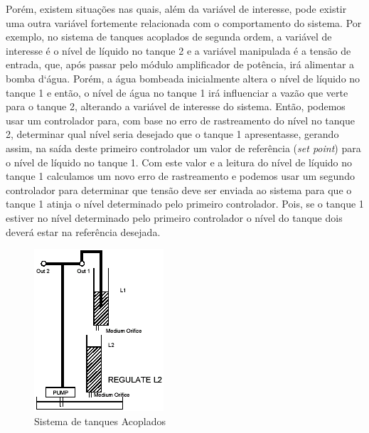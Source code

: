 \documentclass[a4paper,12pt]{article}
\begin{document}
\begin{flushleft}
\begin{flushleft}
\hspace{4ex}Porém, existem situações nas quais, além da variável de interesse, pode existir uma outra variável fortemente relacionada com o comportamento do sistema. Por exemplo, no sistema de tanques acoplados de segunda ordem, a variável de interesse é o nível de líquido no tanque 2 e a variável manipulada é a tensão de entrada, que, após passar pelo módulo amplificador de potência, irá alimentar a bomba d`água. Porém, a água bombeada inicialmente altera o nível de líquido no tanque 1 e então, o nível de água no tanque 1 irá influenciar a vazão que verte para o tanque 2, alterando a variável de interesse do sistema. Então, podemos usar um controlador para, com base no erro de rastreamento do nível no tanque 2, determinar qual nível seria desejado que o tanque 1 apresentasse, gerando assim, na saída deste primeiro controlador um valor de referência (\textit{set point}) para o nível de líquido no tanque 1. Com este valor e a leitura do nível de líquido no tanque 1 calculamos um novo erro de rastreamento e podemos usar um segundo controlador para determinar que tensão deve ser enviada ao sistema para que o tanque 1 atinja o nível determinado pelo primeiro controlador. Pois, se o tanque 1 estiver no nível determinado pelo primeiro controlador o nível do tanque dois deverá estar na referência desejada.

\end{flushleft}

\begin{figure}[h]
    \centering
    \includegraphics{images/1_relatorio/config_2.png}
    \caption{Sistema de tanques Acoplados}
    \label{fig:sistema_de_tanques_acoplados}
\end{figure}

 
 

\end{flushleft}
\end{document}
